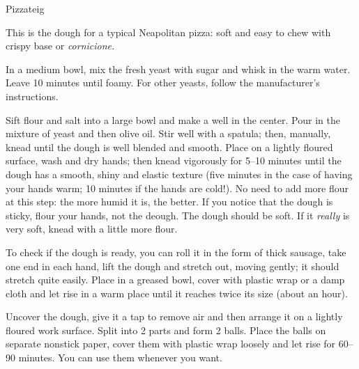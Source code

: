 \begin{recipe}{Pizzateig}

    \begin{ingredients}
    \end{ingredients}

    \begin{instructions}
        This is the dough for a typical Neapolitan pizza: soft and easy to chew with crispy base or \emph{cornicione.}

        In a medium bowl, mix the fresh yeast with sugar and whisk in the warm water.
        Leave 10 minutes until foamy.
        For other yeasts, follow the manufacturer's instructions.

        Sift flour and salt into a large bowl and make a well in the center.
        Pour in the mixture of yeast and then olive oil.
        Stir well with a spatula; then, manually, knead until the dough is well blended and smooth.
        Place on a lightly floured surface, wash and dry hands; then knead vigorously for 5--10 minutes until the dough has a smooth, shiny and elastic texture (five minutes in the case of having your hands warm; 10 minutes if the hands are cold!).
        No need to add more flour at this step: the more humid it is, the better.
        If you notice that the dough is sticky, flour your hands, not the deough.
        The dough should be soft.
        If it \emph{really} is very soft, knead with a little more flour.

        To check if the dough is ready, you can roll it in the form of thick sausage, take one end in each hand, lift the dough and stretch out, moving gently; it should stretch quite easily.
        Place in a greased bowl, cover with plastic wrap or a damp cloth and let rise in a warm place until it reaches twice its size (about an hour).

        Uncover the dough, give it a tap to remove air and then arrange it on a lightly floured work surface.
        Split into 2 parts and form 2 balls.
        Place the balls on separate nonstick paper, cover them with plastic wrap loosely and let rise for 60--90 minutes.
        You can use them whenever you want.
    \end{instructions}
\end{recipe}

